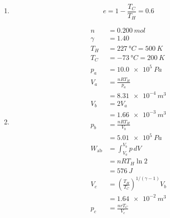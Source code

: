 \documentclass{article}
\begin{document}
\subsubsection{}

\begin{enumerate}
  \item \[e = 1 - \frac{T_C}{T_H} = 0.6\]

  \item

        \begin{align*}
          n           & = \qty{0.200}{mol}                                      \\
          \gamma      & = 1.40                                                  \\
          T_H         & = \qty{227}{\degree C} = \qty{500}{K}                   \\
          T_C         & = \qty{-73}{\degree C} = \qty{200}{K}                   \\
          p_a         & = \qty{10.0e5}{Pa}                                      \\
          V_a         & = \frac{n R T_H}{p_a}                                   \\
                      & = \qty{8.31e-4}{m^3}                                    \\
          V_b         & = 2 V_a                                                 \\
                      & = \qty{1.66e-3}{m^3}                                    \\
          p_b         & = \frac{n R T_H}{V_b}                                   \\
                      & = \qty{5.01e5}{Pa}                                      \\
          W_\text{ab} & = \int_{V_a}^{V_b} p \,d V                              \\
                      & = n R T_H \ln 2                                         \\
                      & = \qty{576}{J}                                          \\
          V_c         & = \left( \frac{T_H}{T_C} \right)^{1 / (\gamma - 1)} V_b \\
                      & = \qty{1.64e-2}{m^3}                                    \\
          p_c         & = \frac{n r T_C}{V_c}                                   \\

\end{align*}
\end{enumerate}
\end{document}
